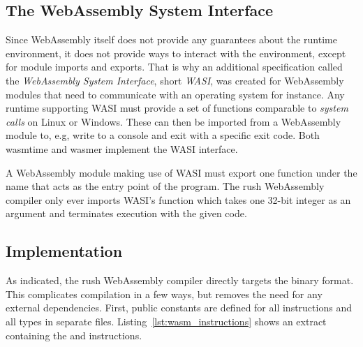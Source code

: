 \subsection{The WebAssembly System Interface}
Since WebAssembly itself does not provide any guarantees about the runtime environment, it does not provide ways to interact with the environment, except for module imports and exports.
That is why an additional specification called the \emph{WebAssembly System Interface}, short \emph{WASI}, was created for WebAssembly modules that need to communicate with an operating system for instance.
Any runtime supporting WASI must provide a set of functions comparable to \emph{system calls} on Linux or Windows.
These can then be imported from a WebAssembly module to, e.g, write to a console and exit with a specific exit code.
Both wasmtime and wasmer implement the WASI interface.

A WebAssembly module making use of WASI must export one function under the name  that acts as the entry point of the program.
The rush WebAssembly compiler only ever imports WASI's  function which takes one 32-bit integer as an argument and terminates execution with the given code.

\subsection{Implementation}


As indicated, the rush WebAssembly compiler directly targets the binary format.
This complicates compilation in a few ways, but removes the need for any external dependencies.
First, public constants are defined for all instructions and all types in separate files.
Listing~\ref{lst:wasm_instructions} shows an extract containing the  and  instructions.

